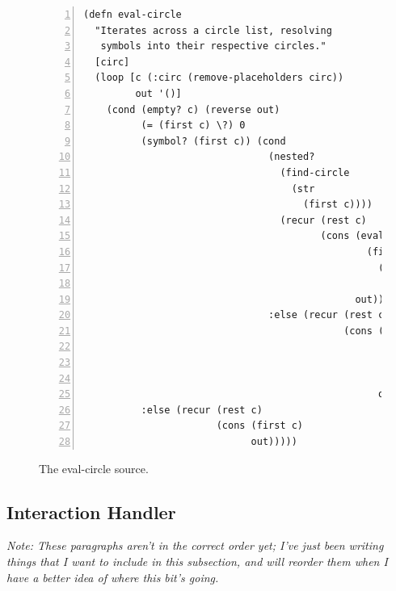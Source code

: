 \documentclass[12pt,twoside,notitlepage,xetex]{report}
\begin{document}
\begin{center}
\begin{figure}[H]
\begin{center}
\begin{minipage}{\textwidth-2cm}
\begin{Verbatim}[fontsize=\small,numbers=left]
(defn eval-circle
  "Iterates across a circle list, resolving
   symbols into their respective circles."
  [circ]
  (loop [c (:circ (remove-placeholders circ))
         out '()]
    (cond (empty? c) (reverse out)
          (= (first c) \?) 0
          (symbol? (first c)) (cond
                                (nested?
                                  (find-circle
                                    (str
                                      (first c))))
                                  (recur (rest c)
                                         (cons (eval-circle
                                                 (find-circle
                                                   (str
                                                     (first c))))
                                               out))
                                :else (recur (rest c)
                                             (cons (:circ
                                                     (find-circle
                                                       (str
                                                         (first c))))
                                                   out)))
          :else (recur (rest c)
                       (cons (first c)
                             out)))))
\end{Verbatim}
\end{minipage}
\end{center}
\caption{The {\ttfamily eval-circle} source.}
\end{figure}
\end{center}


\subsection{Interaction Handler}

\emph{{\sc Note:} These paragraphs aren't in the correct order yet; I've just been writing things that I want to include in this subsection, and will reorder them when I have a better idea of where this bit's going.}
\end{document}
